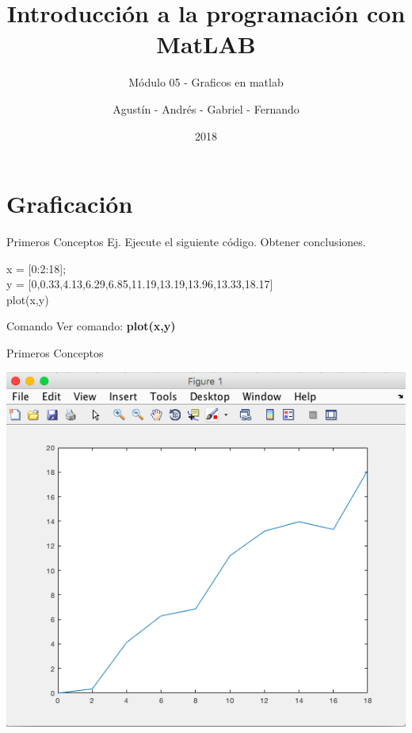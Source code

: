 \documentclass{bredelebeamer}
\title[Programación en MatLAB]{Introducción a la programación con MatLAB}
\subtitle{Módulo 05 - Graficos en matlab}
\author{Agustín - Andrés - Gabriel - Fernando\inst{1}}
\institute[UTN.BA]
{
  \inst{1}%
  Universidad Tecnológica Nacional\\
  Facultad Regional Buenos Aires
  }
\date{2018}
\begin{document}
\begin{frame}
  \titlepage 
\end{frame}




\section{Graficación}

\begin{frame}{Primeros Conceptos}
Ej. Ejecute el siguiente código. Obtener conclusiones.
\begin{center}
x = [0:2:18];\\
y = [0,0.33,4.13,6.29,6.85,11.19,13.19,13.96,13.33,18.17]\\
plot(x,y)\\
\end{center}
\begin{exampleblock}{Comando}
Ver comando: \textbf{plot(x,y)}
\end{exampleblock}
\end{frame}

\begin{frame}{Primeros Conceptos}
\begin{center}
\includegraphics[scale=0.35]{images/pantalla14.png}
\end{center}
\end{frame}
\end{document}
